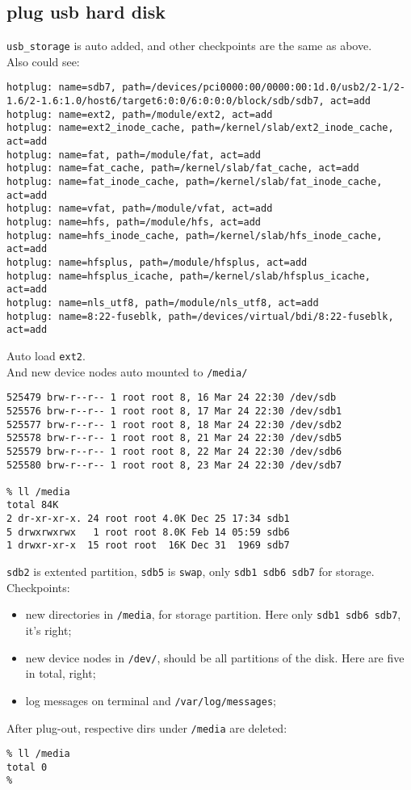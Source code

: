 \documentclass[a4paper]{report}
\begin{document}
\subsection{plug usb hard disk}
{\tt usb\_storage} is auto added, and other checkpoints are the same as above.\\
Also could see:
\begin{lstlisting}
hotplug: name=sdb7, path=/devices/pci0000:00/0000:00:1d.0/usb2/2-1/2-1.6/2-1.6:1.0/host6/target6:0:0/6:0:0:0/block/sdb/sdb7, act=add
hotplug: name=ext2, path=/module/ext2, act=add
hotplug: name=ext2_inode_cache, path=/kernel/slab/ext2_inode_cache, act=add
hotplug: name=fat, path=/module/fat, act=add
hotplug: name=fat_cache, path=/kernel/slab/fat_cache, act=add
hotplug: name=fat_inode_cache, path=/kernel/slab/fat_inode_cache, act=add
hotplug: name=vfat, path=/module/vfat, act=add
hotplug: name=hfs, path=/module/hfs, act=add
hotplug: name=hfs_inode_cache, path=/kernel/slab/hfs_inode_cache, act=add
hotplug: name=hfsplus, path=/module/hfsplus, act=add
hotplug: name=hfsplus_icache, path=/kernel/slab/hfsplus_icache, act=add
hotplug: name=nls_utf8, path=/module/nls_utf8, act=add
hotplug: name=8:22-fuseblk, path=/devices/virtual/bdi/8:22-fuseblk, act=add
\end{lstlisting}
Auto load {\tt ext2}.\\
And new device nodes auto mounted to {\tt /media/}
\begin{lstlisting}
525479 brw-r--r-- 1 root root 8, 16 Mar 24 22:30 /dev/sdb
525576 brw-r--r-- 1 root root 8, 17 Mar 24 22:30 /dev/sdb1
525577 brw-r--r-- 1 root root 8, 18 Mar 24 22:30 /dev/sdb2
525578 brw-r--r-- 1 root root 8, 21 Mar 24 22:30 /dev/sdb5
525579 brw-r--r-- 1 root root 8, 22 Mar 24 22:30 /dev/sdb6
525580 brw-r--r-- 1 root root 8, 23 Mar 24 22:30 /dev/sdb7

% ll /media
total 84K
2 dr-xr-xr-x. 24 root root 4.0K Dec 25 17:34 sdb1
5 drwxrwxrwx   1 root root 8.0K Feb 14 05:59 sdb6
1 drwxr-xr-x  15 root root  16K Dec 31  1969 sdb7
\end{lstlisting}
{\tt sdb2} is extented partition, {\tt sdb5} is {\tt swap}, only
{\tt sdb1 sdb6 sdb7} for storage. \\
Checkpoints:
\begin{itemize}
    \item new directories in {\tt /media}, for storage partition. Here only 
          {\tt sdb1 sdb6 sdb7}, it's right;
    \item new device nodes in {\tt /dev/}, should be all partitions of the disk. 
          Here are five in total, right;
    \item log messages on terminal and {\tt /var/log/messages};
\end{itemize}
After plug-out, respective dirs under {\tt /media} are deleted:
\begin{lstlisting}
% ll /media
total 0
%
\end{lstlisting}
\end{document}
